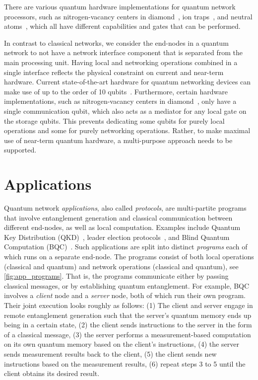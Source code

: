 There are various quantum hardware implementations for quantum network processors, such as nitrogen-vacancy centers in diamond~\cite{Bernien2014}, ion traps~\cite{moehring2007entanglement}, and neutral atoms~\cite{hofmann2012heralded,ritter2012elementary}, which all have different capabilities and gates that can be performed.

In contrast to classical networks, we consider the end-nodes in a quantum network to not have a network interface component that is separated from the main processing unit.
Having local and networking operations combined in a single interface reflects the physical constraint on current and near-term hardware.
Current state-of-the-art hardware for quantum networking devices can make use of up to the order of 10 qubits~\cite{bradley2019solidstate}.
Furthermore, certain hardware implementations, such as nitrogen-vacancy centers in diamond~\cite{Bernien2014}, only have a single communication qubit, which also acts as a mediator for any local gate on the storage qubits.
This prevents dedicating some qubits for purely local operations and some for purely networking operations.
Rather, to make maximal use of near-term quantum hardware, a multi-purpose approach needs to be supported.


\section{Applications}
Quantum network \textit{applications}, also called \textit{protocols}, are multi-partite programs that involve entanglement generation and classical communication between different end-nodes, as well as local computation.
Examples include Quantum Key Distribution (QKD)~\cite{bb84, ekert1991quantum}, leader election protocols~\cite{kobayashi2014simpler, ganz2009quantum}, and Blind Quantum Computation (BQC)~\cite{Wehner2018stages}.
Such applications are split into distinct \textit{programs} each of which runs on a separate end-node.
The programs consist of both local operations (classical and quantum) and network operations (classical and quantum), see \cref{fig:app_programs}.
That is, the programs communicate either by passing classical messages, or by establishing quantum entanglement.
For example, BQC involves a \textit{client} node and a \textit{server} node, both of which run their own program.
Their joint execution looks roughly as follows:
    (1) The client and server engage in remote entanglement generation such that the server's quantum memory ends up being in a certain state,
    (2) the client sends instructions to the server in the form of a classical message,
    (3) the server performs a measurement-based computation on its own quantum memory based on the client's instructions,
    (4) the server sends measurement results back to the client,
    (5) the client sends new instructions based on the measurement results,
    (6) repeat steps 3 to 5 until the client obtains its desired result.

